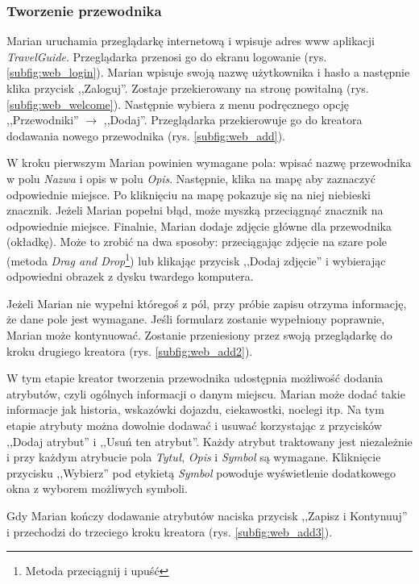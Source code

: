 \documentclass[a4paper]{book}
\newcommand{\appName}{\emph{TravelGuide}}
\begin{document}
			\subsubsection{Tworzenie przewodnika}
			
			Marian uruchamia przeglądarkę internetową i wpisuje adres www aplikacji \appName. Przeglądarka przenosi go do ekranu logowanie (rys. \ref{subfig:web_login}). Marian wpisuje swoją nazwę użytkownika i hasło a następnie klika przycisk ,,Zaloguj''. Zostaje przekierowany na stronę powitalną (rys. \ref{subfig:web_welcome}). Następnie wybiera z menu podręcznego opcję ,,Przewodniki'' $\rightarrow$ ,,Dodaj''. Przeglądarka przekierowuje go do kreatora dodawania nowego przewodnika (rys. \ref{subfig:web_add}). 
			
			W kroku pierwszym Marian powinien wymagane pola: wpisać nazwę przewodnika w polu \textit{Nazwa} i opis w polu \textit{Opis}. Następnie, klika na mapę aby zaznaczyć odpowiednie miejsce. Po kliknięciu na mapę pokazuje się na niej niebieski znacznik. Jeżeli Marian popełni błąd, może myszką przeciągnąć znacznik na odpowiednie miejsce. Finalnie, Marian dodaje zdjęcie główne dla przewodnika (okładkę). Może to zrobić na dwa sposoby: przeciągając zdjęcie na szare pole (metoda \textit{Drag and Drop}\footnote{Metoda przeciągnij i upuść}) lub klikając przycisk ,,Dodaj zdjęcie'' i wybierając odpowiedni obrazek z dysku twardego komputera. 
			
			Jeżeli Marian nie wypełni któregoś z pól, przy próbie zapisu otrzyma informację, że dane pole jest wymagane. Jeśli formularz zostanie wypełniony poprawnie, Marian może kontynuować. Zostanie przeniesiony przez swoją przeglądarkę do kroku drugiego kreatora (rys. \ref{subfig:web_add2}). 
			
			W tym etapie kreator tworzenia przewodnika udostępnia możliwość dodania atrybutów, czyli ogólnych informacji o danym miejscu. Marian może dodać takie informacje jak historia, wskazówki dojazdu, ciekawostki, noclegi itp. Na tym etapie atrybuty można dowolnie dodawać i usuwać korzystając z przycisków ,,Dodaj atrybut'' i ,,Usuń ten atrybut''. Każdy atrybut traktowany jest niezależnie i przy każdym atrybucie pola \textit{Tytuł}, \textit{Opis} i \textit{Symbol} są wymagane. Kliknięcie przycisku ,,Wybierz'' pod etykietą \textit{Symbol} powoduje wyświetlenie dodatkowego okna z wyborem możliwych symboli. 
			
			Gdy Marian kończy dodawanie atrybutów naciska przycisk ,,Zapisz i Kontynuuj'' i przechodzi do trzeciego kroku kreatora (rys. \ref{subfig:web_add3}).
			
\end{document}

